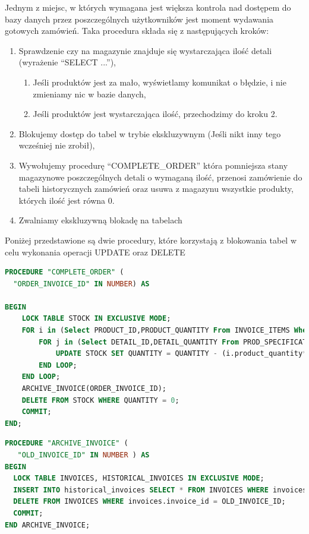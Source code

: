 \documentclass{article}
\begin{document}
Jednym z miejsc, w których wymagana jest większa kontrola nad dostępem do bazy
danych przez poszczególnych użytkowników jest moment wydawania gotowych
zamówień. Taka procedura składa się z następujących kroków:
\begin{enumerate}
   \item Sprawdzenie czy na magazynie znajduje się wystarczająca ilość detali
   (wyrażenie ``SELECT ...''),
   \begin{enumerate}
      \item Jeśli produktów jest za mało, wyświetlamy komunikat o błędzie, i nie
      zmieniamy nic w bazie danych,
      \item Jeśli produktów jest wystarczająca ilość, przechodzimy do kroku 2.
   \end{enumerate}
   \item Blokujemy dostęp do tabel w trybie ekskluzywnym (Jeśli nikt inny tego wcześniej nie zrobił),
   \item Wywołujemy procedurę ``COMPLETE\_ORDER'' która pomniejsza stany
   magazynowe poszczególnych detali o wymaganą ilość, przenosi zamówienie do
   tabeli historycznych zamówień oraz usuwa z magazynu wszystkie produkty,
   których ilość jest równa 0.
   \item Zwalniamy ekskluzywną blokadę na tabelach
\end{enumerate} 
Poniżej przedstawione są dwie procedury, które korzystają z blokowania tabel w
celu wykonania operacji UPDATE oraz DELETE
\begin{lstlisting}[language=sql, frame=single,tabsize=1,breaklines=true,caption={Procedura COMPLETE\_ORDER}]
   PROCEDURE "COMPLETE_ORDER" (
  "ORDER_INVOICE_ID" IN NUMBER) AS

BEGIN 
	LOCK TABLE STOCK IN EXCLUSIVE MODE;
	FOR i in (Select PRODUCT_ID,PRODUCT_QUANTITY From INVOICE_ITEMS Where Invoice_ID=ORDER_INVOICE_ID) LOOP
		FOR j in (Select DETAIL_ID,DETAIL_QUANTITY From PROD_SPECIFICATION Where PRODUCT_ID = i.product_id) LOOP
			UPDATE STOCK SET QUANTITY = QUANTITY - (i.product_quantity*j.detail_quantity) Where DETAIL_ID=j.detail_id;
		END LOOP;
	END LOOP;
    ARCHIVE_INVOICE(ORDER_INVOICE_ID);
	DELETE FROM STOCK WHERE QUANTITY = 0;
	COMMIT;
END;
\end{lstlisting}
\begin{lstlisting}[language=sql, frame=single,tabsize=1,breaklines=true, caption={Procedura ARCHIVE\_INVOICE}]
   PROCEDURE "ARCHIVE_INVOICE" (
   "OLD_INVOICE_ID" IN NUMBER ) AS 
BEGIN
  LOCK TABLE INVOICES, HISTORICAL_INVOICES IN EXCLUSIVE MODE;
  INSERT INTO historical_invoices SELECT * FROM INVOICES WHERE invoices.invoice_id = OLD_INVOICE_ID;
  DELETE FROM INVOICES WHERE invoices.invoice_id = OLD_INVOICE_ID;
  COMMIT;
END ARCHIVE_INVOICE;
\end{lstlisting}
\end{document}
